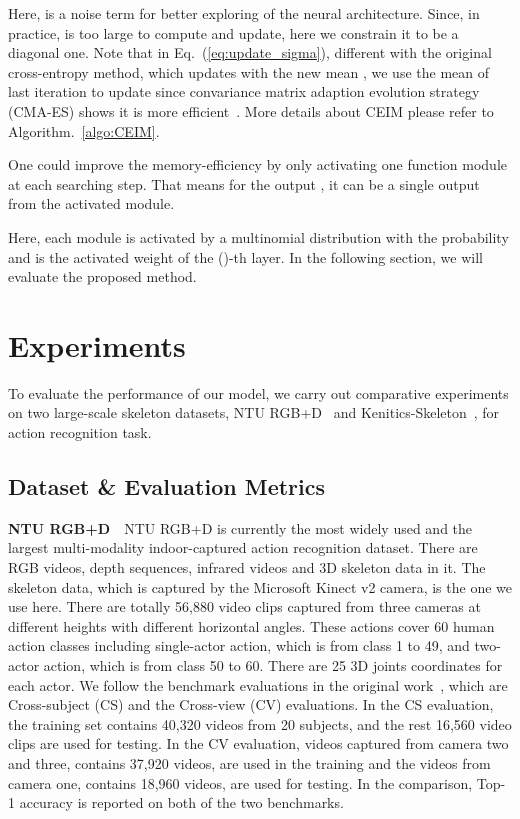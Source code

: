 \documentclass[letterpaper]{article} \usepackage{aaai19}  \usepackage{times}  \usepackage{helvet} \usepackage{courier}  \usepackage[hyphens]{url}  \usepackage{graphicx} \urlstyle{rm} \def\UrlFont{\rm}  \usepackage{graphicx}  \frenchspacing  \setlength{\pdfpagewidth}{8.5in}  \setlength{\pdfpageheight}{11in}
\begin{document}
Here,  is a noise term for better exploring of the neural architecture. Since, in practice,  is too large to compute and update, here we constrain it to be a diagonal one. Note that in Eq.~(\ref{eq:update_sigma}), different with the original cross-entropy method, which updates  with the new mean , we use the mean of last iteration to update  since convariance matrix adaption evolution strategy (CMA-ES) shows it is more efficient~\cite{hansen2016cma}. More details about CEIM please refer to Algorithm.~\ref{algo:CEIM}.

One could improve the memory-efficiency by only activating one function module at each searching step. That means for the output , it can be a single output from the activated module.   


\noindent Here, each module is activated by a multinomial distribution with the probability  and  is the activated weight of the ()-th layer. In the following section, we will evaluate the proposed method.








\section{Experiments}
To evaluate the performance of our model, we carry out comparative experiments on two large-scale skeleton datasets, NTU RGB+D~\cite{shahroudy2016ntu} and Kenitics-Skeleton~\cite{kay2017kinetics,yan2018stgan}, for action recognition task.



\subsection{Dataset \& Evaluation Metrics} 

\textbf{NTU RGB+D}~~NTU RGB+D is currently the most widely used and the largest multi-modality indoor-captured action recognition dataset. There are RGB videos, depth sequences, infrared videos and 3D skeleton data in it. The skeleton data, which is captured by the Microsoft Kinect v2 camera, is the one we use here. There are totally 56,880 video clips captured from three cameras at different heights with different horizontal angles. These actions cover 60 human action classes including single-actor action, which is from class 1 to 49, and two-actor action, which is from class 50 to 60. There are 25 3D joints coordinates for each actor. We follow the benchmark evaluations in the original work~\cite{shahroudy2016ntu}, which are Cross-subject (CS) and the Cross-view (CV) evaluations.  In the CS evaluation, the training set contains 40,320 videos from 20 subjects, and the rest 16,560 video clips are used for testing. In the CV evaluation, videos captured from camera two and three, contains 37,920 videos, are used in the training and the videos from camera one, contains 18,960 videos, are used for testing. In the comparison, Top-1 accuracy is reported on both of the two benchmarks. 
\end{document}
